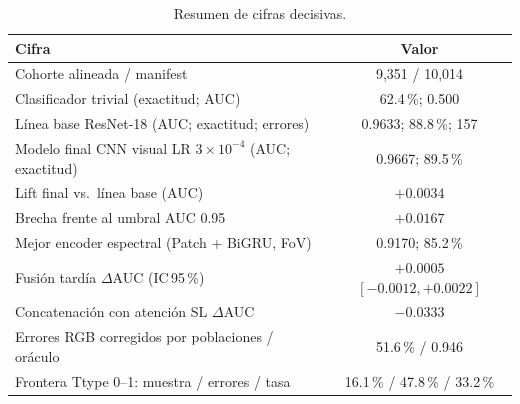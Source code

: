 \begin{table}[htbp]
\centering
\caption{Resumen de cifras decisivas.}
\label{tab:cifras}
\small
\begin{tabular}{lc}
\toprule
\textbf{Cifra} & \textbf{Valor}\\
\midrule
Cohorte alineada / manifest & 9,351 / 10,014\\
Clasificador trivial (exactitud; AUC) & 62.4\,\%; 0.500\\
Línea base ResNet-18 (AUC; exactitud; errores) & 0.9633; 88.8\,\%; 157\\
Modelo final CNN visual LR $3\times10^{-4}$ (AUC; exactitud) & 0.9667; 89.5\,\%\\
Lift final vs.\ línea base (AUC) & $+0.0034$\\
Brecha frente al umbral AUC 0.95 & $+0.0167$\\
Mejor encoder espectral (Patch + BiGRU, FoV) & 0.9170; 85.2\,\%\\
Fusión tardía $\Delta$AUC (IC\,95\,\%) & $+0.0005$ $[-0.0012,+0.0022]$\\
Concatenación con atención SL $\Delta$AUC & $-0.0333$\\
Errores RGB corregidos por poblaciones / oráculo & 51.6\,\% / 0.946\\
Frontera Ttype 0--1: muestra / errores / tasa & 16.1\,\% / 47.8\,\% / 33.2\,\%\\
\bottomrule
\end{tabular}
\end{table}


